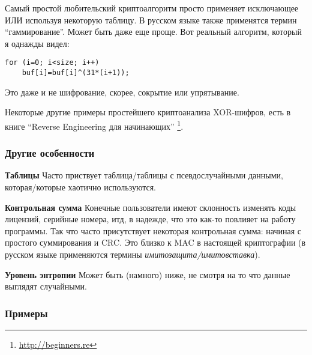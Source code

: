 Самый простой любительский криптоалгоритм просто применяет исключающее ИЛИ используя некоторую таблицу.
В русском языке также применятся термин ``гаммирование''.
Может быть даже еще проще. Вот реальный алгоритм, который я однажды видел:

\begin{lstlisting}
for (i=0; i<size; i++)
    buf[i]=buf[i]^(31*(i+1));
\end{lstlisting}

Это даже и не шифрование, скорее, сокрытие или упрятывание.

Некоторые другие примеры простейшего криптоанализа XOR-шифров, есть в книге ``Reverse Engineering для начинающих''
\footnote{\url{http://beginners.re}}.

\subsubsection{Другие особенности}

\textbf{Таблицы} Часто приствует таблица/таблицы с псевдослучайными данными, которая/которые хаотично используются.

\textbf{Контрольная сумма} Конечные пользователи имеют склонность изменять коды лицензий, серийные номера, итд,
в надежде, что это как-то повлияет на работу программы.
Так что часто присутствует некоторая контрольная сумма: начиная с простого суммирования и \ac{CRC}.
Это близко к \ac{MAC} в настоящей криптографии (в русском языке применяются термины \textit{имитозащита/имитовставка}).

\textbf{Уровень энтропии} Может быть (намного) ниже, не смотря на то что данные выглядят случайными.

\subsubsection{Примеры}

